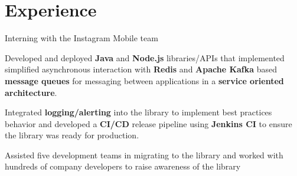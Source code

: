 \documentclass[letterpaper]{deedy-resume} %
\begin{document}
\hfill
%
%
\begin{minipage}[t]{0.66\textwidth} %


\section{Experience}


\vspace{\topsep} %
\begin{tightitemize}
\item Interning with the Instagram Mobile team
\end{tightitemize}

\sectionspace %



\begin{tightitemize}
\item Developed and deployed {\bf Java}  and {\bf Node.js} libraries/APIs that implemented simplified asynchronous interaction with {\bf Redis} and {\bf Apache Kafka} based {\bf message queues} for messaging between applications in a {\bf service oriented architecture}.
\item Integrated {\bf logging/alerting} into the library to implement best practices behavior and developed a {\bf CI/CD} release pipeline using {\bf Jenkins CI} to ensure the library was ready for production.
\item Assisted five development teams in migrating to the library and worked with hundreds of company developers to raise awareness of the library
\end{tightitemize}

\sectionspace %


\end{minipage}
\end{document}
